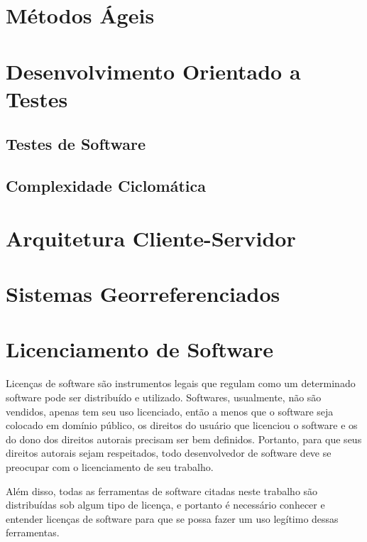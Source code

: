
\section{Métodos Ágeis}

\section{Desenvolvimento Orientado a Testes}\label{fun:tdd}

\subsection{Testes de Software}

\subsection{Complexidade Ciclomática}

\section{Arquitetura Cliente-Servidor}

\section{Sistemas Georreferenciados}

\section{Licenciamento de Software}

Licenças de software são instrumentos legais que regulam como um determinado software pode ser distribuído e utilizado.
Softwares, usualmente, não são vendidos, apenas tem seu uso licenciado, então a menos que o software seja colocado em domínio público, os direitos do usuário que licenciou o software e os do dono dos direitos autorais precisam ser bem definidos. Portanto, para que seus direitos autorais sejam respeitados, todo desenvolvedor de software deve se preocupar com o licenciamento de seu trabalho.

Além disso, todas as ferramentas de software citadas neste trabalho são distribuídas sob algum tipo de licença, e portanto é necessário conhecer e entender licenças de software para que se possa fazer um uso legítimo dessas ferramentas.


